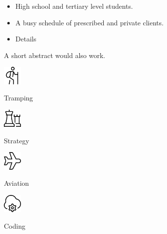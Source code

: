 \documentclass[11pt,a4paper,ragged2e,withhyper]{altacv}
\begin{document}
\begin{paracol}{2}
  \divider

  \begin{itemize}
    \item High school and tertiary level students.
    \item A busy schedule of prescribed and private clients.
  \end{itemize}


  \begin{itemize}
    \item Details
  \end{itemize}

  \divider

  A short abstract would also work.

  \vspace{-0.8cm}
  \begin{multicols}{4}

    \includegraphics[width=0.07\textwidth]{hiking}

    Tramping

    \includegraphics[width=0.07\textwidth]{chess}

    Strategy

    \includegraphics[width=0.07\textwidth]{plane}

    Aviation

    \includegraphics[width=0.07\textwidth]{automation}

    Coding

  \end{multicols}

\end{paracol}
\end{document}
